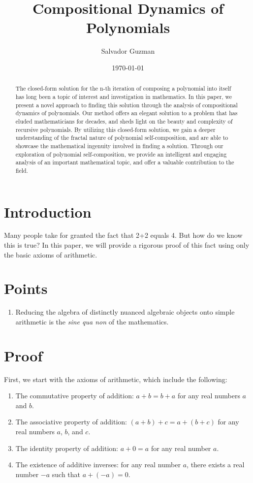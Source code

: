 \documentclass{article}
\title{Compositional Dynamics of Polynomials}
\author{Salvador Guzman}
\date{\today}
\begin{document}
\maketitle
\pagebreak

\begin{abstract}
 The closed-form solution for the n-th iteration of composing a polynomial into itself has long been a topic of interest and investigation in mathematics. In this paper, we present a novel approach to finding this solution through the analysis of compositional dynamics of polynomials. Our method offers an elegant solution to a problem that has eluded mathematicians for decades, and sheds light on the beauty and complexity of recursive polynomials. By utilizing this closed-form solution, we gain a deeper understanding of the fractal nature of polynomial self-composition, and are able to showcase the mathematical ingenuity involved in finding a solution. Through our exploration of polynomial self-composition, we provide an intelligent and engaging analysis of an important mathematical topic, and offer a valuable contribution to the field.
\end{abstract}

\pagebreak
\tableofcontents
\pagebreak

\section{Introduction}
Many people take for granted the fact that 2+2 equals 4. But how do we know this is true? In this paper, we will provide a rigorous proof of this fact using only the basic axioms of arithmetic.

\section{Points}
\begin{enumerate}
    \item Reducing the algebra of distinctly nuanced algebraic objects onto
    simple arithmetic is the \textit{sine qua non} of the mathematics.
\end{enumerate}

\section{Proof}
First, we start with the axioms of arithmetic, which include the following:
\begin{enumerate}
    \item The commutative property of addition: $a+b=b+a$ for any real numbers $a$ and $b$.
    \item The associative property of addition: $(a+b)+c=a+(b+c)$ for any real numbers $a$, $b$, and $c$.
    \item The identity property of addition: $a+0=a$ for any real number $a$.
    \item The existence of additive inverses: for any real number $a$, there exists a real number $-a$ such that $a+(-a)=0$.
\end{enumerate}
\end{document}

